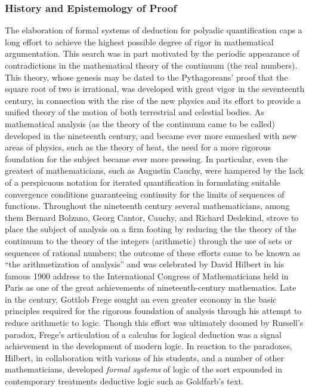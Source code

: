\subsubsection*{History and Epistemology of Proof}
The elaboration of formal systems of deduction for polyadic quantification caps a long effort to achieve the highest possible degree of rigor in mathematical argumentation. This search was in part motivated by the periodic appearance of contradictions in the mathematical theory of the continuum (the real numbers). This theory, whose genesis may be dated to the Pythagoreans' proof that the square root of two is irrational, was developed with great vigor in the seventeenth century, in connection with the rise of the new physics and its effort to provide a unified theory of the motion of both terrestrial and celestial bodies. As mathematical analysis (as the theory of the continuum came to be called) developed in the nineteenth century, and became ever more enmeshed with new areas of physics, such as the theory of heat, the need for a more rigorous foundation for the subject became ever more pressing. In particular, even the greatest of mathematicians, such as Augustin Cauchy, were hampered by the lack of a perspicuous notation for iterated quantification in formulating suitable convergence conditions guaranteeing continuity for the limits of sequences of functions. Throughout the nineteenth century several mathematicians, among them Bernard Bolzano, Georg Cantor, Cauchy, and Richard Dedekind, strove to place the subject of analysis on a firm footing by reducing the the theory of the continuum to the theory of the integers (arithmetic) through the use of sets or sequences of rational numbers; the outcome of these efforts came to be known as ``the arithmetization of analysis'' and was celebrated by David Hilbert in his famous 1900 address to the International Congress of Mathematicians held in Paris as one of the great achievements of nineteenth-century mathematics. Late in the century, Gottlob Frege sought an even greater economy in the basic principles required for the rigorous foundation of analysis through his attempt to reduce arithmetic to logic. Though this effort was ultimately doomed by Russell's paradox, Frege's articulation of a calculus for logical deduction was a signal achievement in the development of modern logic. In reaction to the paradoxes, Hilbert, in collaboration with various of his students, and a number of other mathematicians, developed \emph{formal systems} of logic of the sort expounded in contemporary treatments deductive logic such as Goldfarb's text. 

